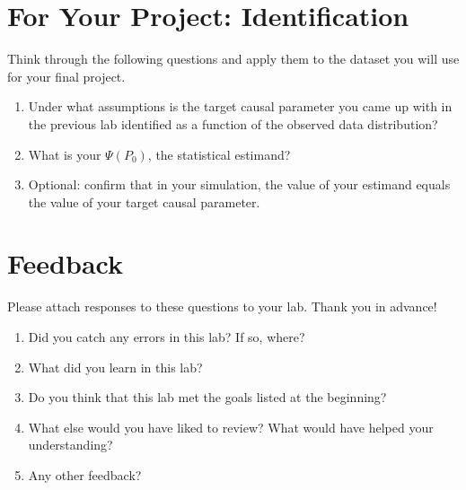 \documentclass[answers]{exam}
\begin{document}
\pagebreak
\section{For Your Project: Identification}

Think through the following questions and apply them to the dataset you will use for your final project.

\begin{enumerate}
\item Under what assumptions is the target causal parameter you came up with in the previous lab identified as a function of the observed data distribution?
\item What is your $\Psi(P_0)$, the statistical estimand?
\item Optional: confirm that in your simulation, the value of your estimand equals the value of your target causal parameter.
\end{enumerate}

\pagebreak

\section{Feedback}

Please attach responses to these questions to your lab. Thank you in advance!

\begin{enumerate}
\item Did you catch any errors in this lab? If so, where?
\item What did you learn in this lab?
\item Do you think that this lab met the goals listed at the beginning? 
\item What else would you have liked to review? What would have helped your understanding?
\item Any other feedback?
\end{enumerate}
\end{document}

